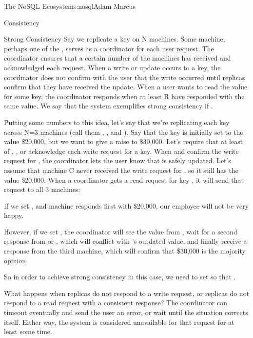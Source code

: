 \begin{aosachapter}{The NoSQL Ecosystem}{s:nosql}{Adam Marcus}
\begin{aosasect1}{Consistency}
\begin{aosasect2}{Strong Consistency}
Say we replicate a key on N machines.  Some machine, perhaps one of
the , serves as a coordinator for each user request.  The
coordinator ensures that a certain number of the  machines has
received and acknowledged each request.  When a write or update occurs
to a key, the coordinator does not confirm with the user that the
write occurred until  replicas confirm that they have received
the update.  When a user wants to read the value for some key, the
coordinator responds when at least R have responded with the same
value.  We say that the system exemplifies strong consistency if
.

Putting some numbers to this idea, let's say that we're replicating
each key across N=3 machines (call them , , and
).  Say that the key  is initially set
to the value \$20,000, but we want to give  a raise
to \$30,000.  Let's require that at least  of ,
, or  acknowledge each write request for a key.  When
 and  confirm the write request for , the coordinator lets the user know that
 is safely updated.  Let's assume that machine
C never received the write request for , so it
still has the value \$20,000.  When a coordinator gets a read request
for key , it will send that request to all 3
machines:

\begin{aosaitemize}

  \item If we set , and machine  responds first with
  \$20,000, our employee will not be very happy.

  \item However, if we set , the coordinator will see the
  value from , wait for a second response from  or
  , which will conflict with 's outdated value, and
  finally receive a response from the third machine, which will
  confirm that \$30,000 is the majority opinion.

\end{aosaitemize}

So in order to achieve strong consistency in this case, we need to set
 so that .

What happens when  replicas do not respond to a write request,
or  replicas do not respond to a read request with a
consistent response?  The coordinator can timeout eventually and send
the user an error, or wait until the situation corrects itself.
Either way, the system is considered unavailable for that request for
at least some time.


\end{aosasect2}
\end{aosasect1}
\end{aosachapter}

